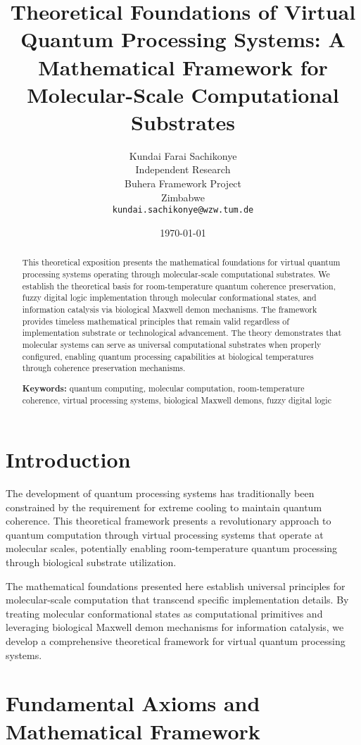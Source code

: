 \documentclass[12pt]{article}
\title{Theoretical Foundations of Virtual Quantum Processing Systems: A Mathematical Framework for Molecular-Scale Computational Substrates}
\author{
Kundai Farai Sachikonye\\
Independent Research\\
Buhera Framework Project\\
Zimbabwe\\
\texttt{kundai.sachikonye@wzw.tum.de}
}
\date{\today}
\begin{document}
\maketitle

\begin{abstract}
This theoretical exposition presents the mathematical foundations for virtual quantum processing systems operating through molecular-scale computational substrates. We establish the theoretical basis for room-temperature quantum coherence preservation, fuzzy digital logic implementation through molecular conformational states, and information catalysis via biological Maxwell demon mechanisms. The framework provides timeless mathematical principles that remain valid regardless of implementation substrate or technological advancement. The theory demonstrates that molecular systems can serve as universal computational substrates when properly configured, enabling quantum processing capabilities at biological temperatures through coherence preservation mechanisms.

\textbf{Keywords:} quantum computing, molecular computation, room-temperature coherence, virtual processing systems, biological Maxwell demons, fuzzy digital logic
\end{abstract}

\section{Introduction}

The development of quantum processing systems has traditionally been constrained by the requirement for extreme cooling to maintain quantum coherence. This theoretical framework presents a revolutionary approach to quantum computation through virtual processing systems that operate at molecular scales, potentially enabling room-temperature quantum processing through biological substrate utilization.

The mathematical foundations presented here establish universal principles for molecular-scale computation that transcend specific implementation details. By treating molecular conformational states as computational primitives and leveraging biological Maxwell demon mechanisms for information catalysis, we develop a comprehensive theoretical framework for virtual quantum processing systems.

\section{Fundamental Axioms and Mathematical Framework}
\end{document}
